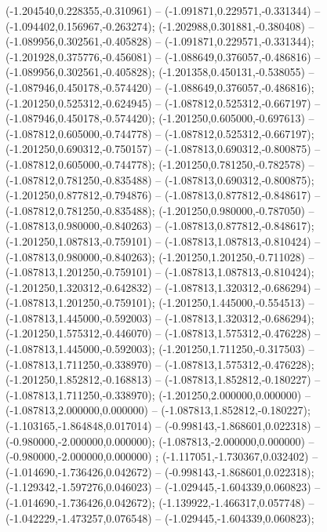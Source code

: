  (-1.204540,0.228355,-0.310961) -- (-1.091871,0.229571,-0.331344) -- (-1.094402,0.156967,-0.263274);
 (-1.202988,0.301881,-0.380408) -- (-1.089956,0.302561,-0.405828) -- (-1.091871,0.229571,-0.331344);
 (-1.201928,0.375776,-0.456081) -- (-1.088649,0.376057,-0.486816) -- (-1.089956,0.302561,-0.405828);
 (-1.201358,0.450131,-0.538055) -- (-1.087946,0.450178,-0.574420) -- (-1.088649,0.376057,-0.486816);
 (-1.201250,0.525312,-0.624945) -- (-1.087812,0.525312,-0.667197) -- (-1.087946,0.450178,-0.574420);
 (-1.201250,0.605000,-0.697613) -- (-1.087812,0.605000,-0.744778) -- (-1.087812,0.525312,-0.667197);
 (-1.201250,0.690312,-0.750157) -- (-1.087813,0.690312,-0.800875) -- (-1.087812,0.605000,-0.744778);
 (-1.201250,0.781250,-0.782578) -- (-1.087812,0.781250,-0.835488) -- (-1.087813,0.690312,-0.800875);
 (-1.201250,0.877812,-0.794876) -- (-1.087813,0.877812,-0.848617) -- (-1.087812,0.781250,-0.835488);
 (-1.201250,0.980000,-0.787050) -- (-1.087813,0.980000,-0.840263) -- (-1.087813,0.877812,-0.848617);
 (-1.201250,1.087813,-0.759101) -- (-1.087813,1.087813,-0.810424) -- (-1.087813,0.980000,-0.840263);
 (-1.201250,1.201250,-0.711028) -- (-1.087813,1.201250,-0.759101) -- (-1.087813,1.087813,-0.810424);
 (-1.201250,1.320312,-0.642832) -- (-1.087813,1.320312,-0.686294) -- (-1.087813,1.201250,-0.759101);
 (-1.201250,1.445000,-0.554513) -- (-1.087813,1.445000,-0.592003) -- (-1.087813,1.320312,-0.686294);
 (-1.201250,1.575312,-0.446070) -- (-1.087813,1.575312,-0.476228) -- (-1.087813,1.445000,-0.592003);
 (-1.201250,1.711250,-0.317503) -- (-1.087813,1.711250,-0.338970) -- (-1.087813,1.575312,-0.476228);
 (-1.201250,1.852812,-0.168813) -- (-1.087813,1.852812,-0.180227) -- (-1.087813,1.711250,-0.338970);
 (-1.201250,2.000000,0.000000) -- (-1.087813,2.000000,0.000000) -- (-1.087813,1.852812,-0.180227);
 (-1.103165,-1.864848,0.017014) -- (-0.998143,-1.868601,0.022318) -- (-0.980000,-2.000000,0.000000);
 (-1.087813,-2.000000,0.000000) -- (-0.980000,-2.000000,0.000000) ;
 (-1.117051,-1.730367,0.032402) -- (-1.014690,-1.736426,0.042672) -- (-0.998143,-1.868601,0.022318);
 (-1.129342,-1.597276,0.046023) -- (-1.029445,-1.604339,0.060823) -- (-1.014690,-1.736426,0.042672);
 (-1.139922,-1.466317,0.057748) -- (-1.042229,-1.473257,0.076548) -- (-1.029445,-1.604339,0.060823);
